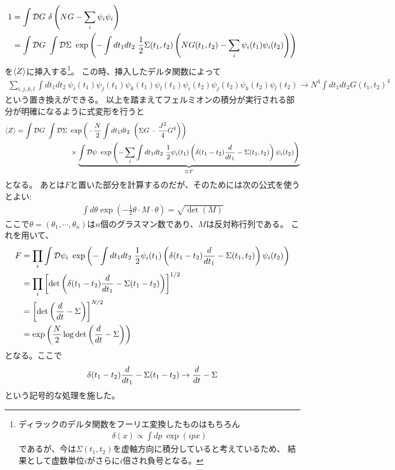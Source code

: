 	\begin{align}
	1 &= \int \mathcal{D}G \ \delta\left(NG - \sum_i\psi_i\psi_i\right)\nonumber\\
	  &= \int \mathcal{D}G \ \int \mathcal{D}\Sigma \ \exp\left(
	  		-\int dt_1dt_2\ \frac{1}{2}\Sigma(t_1, t_2)\left(
	  		NG(t_1, t_2) - \sum_i\psi_i(t_1)\psi_i(t_2)\right)
	  	\right)
	\end{align}
	を$\langle Z \rangle$に挿入する\footnote{ディラックのデルタ関数をフーリエ変換したものはもちろん
	\begin{align}
	\delta(x) \propto \int dp\ \exp(ipx)\nonumber
	\end{align}であるが、今は$\Sigma(t_1, t_2)$を虚軸方向に積分していると考えているため、
	結果として虚数単位$i$がさらに$i$倍され負号となる。}。
	この時、挿入したデルタ関数によって
	\begin{align}
	\sum_{i,j,k,l}\int dt_1dt_2\
	\psi_i(t_1)\psi_j(t_1)\psi_k(t_1)\psi_l(t_1)
	\psi_i(t_2)\psi_j(t_2)\psi_k(t_2)\psi_l(t_2)
	\to N^4\int dt_1 dt_2 G(t_1, t_2)^4
	\end{align}
	という置き換えができる。
	以上を踏まえてフェルミオンの積分が実行される部分が明確になるように式変形を行うと
	\begin{align}
	\langle Z \rangle = \int \mathcal{D}G \ \int \mathcal{D}\Sigma \ &\exp\left(
	-\frac{N}{2}\int dt_1dt_2\ \left(\Sigma G - \frac{J^2}{4}G^4\right)
	\right)\nonumber\\
	&\times\underbrace{\int \mathcal{D}\psi \ \exp\left(
	-\sum_i\int dt_1dt_2\ \frac{1}{2}\psi_i(t_1)\left(
	\delta(t_1 - t_2)\frac{d}{dt_1} - \Sigma(t_1, t_2)
	\right)\psi_i(t_2)
	\right)}_{\equiv F}
	\end{align}
	となる。
	あとは$F$と置いた部分を計算するのだが、そのためには次の公式を使うとよい\cite{haber}:
	\begin{align}
	\int d\theta \exp\left(-\frac{1}{2}\theta\cdot M\cdot\theta\right) = \sqrt{\det(M)}
	\end{align}
	ここで$\theta = (\theta_1, \cdots, \theta_n)$は$n$個のグラスマン数であり、$M$は反対称行列である。
	これを用いて、
	\begin{align}
	F &= \prod_i \int \mathcal{D}\psi_i \  \exp\left(
	-\int dt_1dt_2\ \frac{1}{2}\psi_i(t_1)\left(
	\delta(t_1 - t_2)\frac{d}{dt_1} - \Sigma(t_1, t_2)
	\right)\psi_i(t_2)\right)\nonumber\\
	&= \prod_i \left[
	\det\left(\delta(t_1 - t_2)\frac{d}{dt_1} - \Sigma(t_1 - t_2)\right)
	\right]^{1/2}\nonumber\\
	&= \left[\det\left(\frac{d}{dt} - \Sigma\right)\right]^{N/2}\nonumber\\
	&= \exp\left(\frac{N}{2}\log\det\left(\frac{d}{dt} - \Sigma\right)\right)
	\end{align}
	となる。ここで
	\begin{align}
	\delta(t_1 - t_2)\frac{d}{dt_1} - \Sigma(t_1 - t_2) \to \frac{d}{dt} - \Sigma
	\end{align}
	という記号的な処理を施した。

